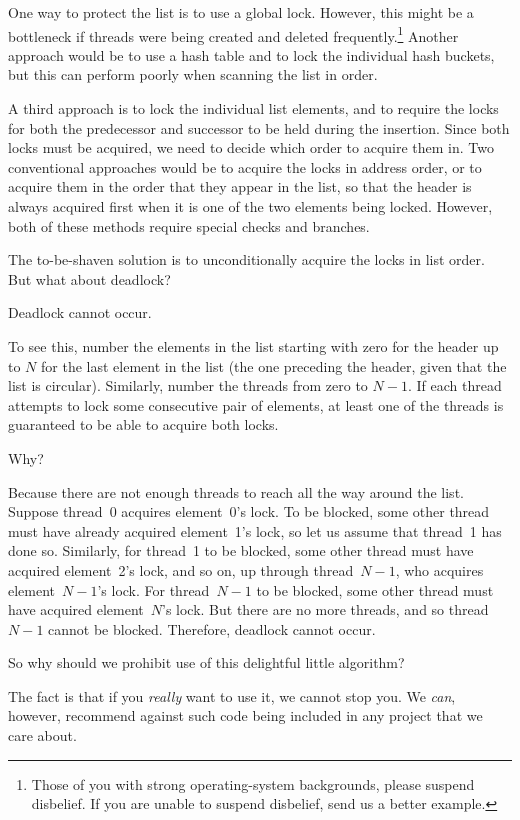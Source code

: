 One way to protect the list is to use a global lock.
However, this might be a bottleneck if threads were being created and
deleted frequently.\footnote{
	Those of you with strong operating-system backgrounds, please
	suspend disbelief.
	If you are unable to suspend disbelief, send us a better example.}
Another approach would be to use a hash table and to lock the individual
hash buckets, but this can perform poorly when scanning the list in order.

A third approach is to lock the individual list elements, and to require
the locks for both the predecessor and successor to be held during the
insertion.
Since both locks must be acquired, we need to decide which order to
acquire them in.
Two conventional approaches would be to acquire the locks in address
order, or to acquire them in the order that they appear in the list,
so that the header is always acquired first when it is one of the two
elements being locked.
However, both of these methods require special checks and branches.

The to-be-shaven solution is to unconditionally acquire the locks in
list order.
But what about deadlock?

Deadlock cannot occur.

To see this, number the elements in the list starting with zero for the
header up to $N$ for the last element in the list (the one preceding the
header, given that the list is circular).
Similarly, number the threads from zero to $N-1$.
If each thread attempts to lock some consecutive pair of elements,
at least one of the threads is guaranteed to be able to acquire both
locks.

Why?

Because there are not enough threads to reach all the way around the list.
Suppose thread~0 acquires element~0's lock.
To be blocked, some other thread must have already acquired element~1's
lock, so let us assume that thread~1 has done so.
Similarly, for thread~1 to be blocked, some other thread must have acquired
element~2's lock, and so on, up through thread~$N-1$, who acquires
element~$N-1$'s lock.
For thread~$N-1$ to be blocked, some other thread must have acquired
element~$N$'s lock.
But there are no more threads, and so thread~$N-1$ cannot be blocked.
Therefore, deadlock cannot occur.

So why should we prohibit use of this delightful little algorithm?

The fact is that if you \emph{really} want to use it, we cannot stop you.
We \emph{can}, however, recommend against such code being included
in any project that we care about.

